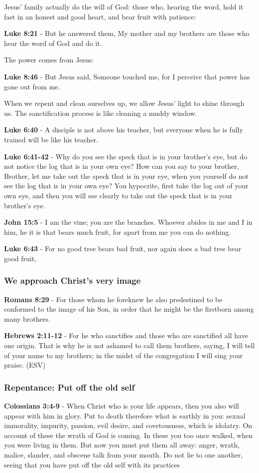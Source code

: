 \documentclass[11pt]{article}
\begin{document}
Jesus' family actually do the will of God: those who, hearing the word, hold it fast in an honest and good heart, and bear fruit with patience:

\textbf{Luke 8:21} - But he answered them, My mother and my brothers are those who hear the word of God and do it.

The power comes from Jesus:

\textbf{Luke 8:46} - But Jesus said, Someone touched me, for I perceive that power has gone out from me.

When we repent and clean ourselves up, we allow Jesus' light to shine through us. The sanctification process is like cleaning a muddy window.

\textbf{Luke 6:40} - A disciple is not above his teacher, but everyone when he is fully trained will be like his teacher.

\textbf{Luke 6:41-42} - Why do you see the speck that is in your brother's eye, but do not notice the log that is in your own eye? How can you say to your brother, Brother, let me take out the speck that is in your eye, when you yourself do not see the log that is in your own eye? You hypocrite, first take the log out of your own eye, and then you will see clearly to take out the speck that is in your brother's eye.

\textbf{John 15:5} - I am the vine; you are the branches. Whoever abides in me and I in him, he it is that bears much fruit, for apart from me you can do nothing.

\textbf{Luke 6:43} - For no good tree bears bad fruit, nor again does a bad tree bear good fruit,

\subsubsection{We approach Christ's very image}
\label{sec:org25fa408}
\textbf{Romans 8:29} - For those whom he foreknew he also predestined to be conformed to the image of his Son, in order that he might be the firstborn among many brothers.

\textbf{Hebrews 2:11-12} -  For he who sanctifies and those who are sanctified all have one origin.  That is why he is not ashamed to call them brothers, saying, I will tell of your name to my brothers; in the midst of the congregation I will sing your praise.  (ESV)

\subsubsection{Repentance: Put off the old self}
\label{sec:org8119cc1}
\textbf{Colossians 3:4-9} - When Christ who is your life appears, then you also will appear with him in glory. Put to death therefore what is earthly in you: sexual immorality, impurity, passion, evil desire, and covetousness, which is idolatry. On account of these the wrath of God is coming. In these you too once walked, when you were living in them. But now you must put them all away: anger, wrath, malice, slander, and obscene talk from your mouth. Do not lie to one another, seeing that you have put off the old self with its practices
\end{document}
